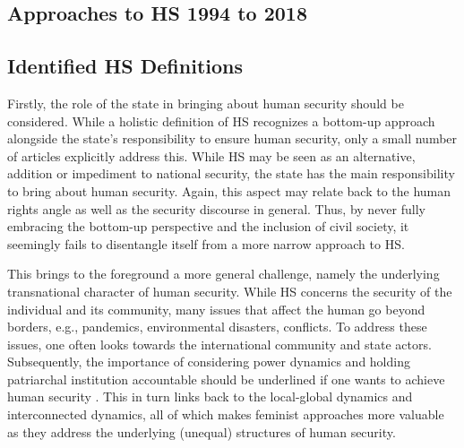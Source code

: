 \documentclass[10pt,a4paper]{article}
\begin{document}
\begin{multicols}{2}

\section{Approaches to HS 1994 to 2018}

\subsection{Identified HS Definitions}

\noindent {}

Firstly, the role of the state in bringing about human security should be considered. While a holistic definition of HS recognizes a bottom-up approach alongside the state's responsibility to ensure human security, only a small number of articles explicitly address this. While HS may be seen as an alternative, addition or impediment to national security, the state has the main responsibility to bring about human security. Again, this aspect may relate back to the human rights angle as well as the security discourse in general. Thus, by never fully embracing the bottom-up perspective and the inclusion of civil society, it seemingly fails to disentangle itself from a more narrow approach to HS. 

This brings to the foreground a more general challenge, namely the underlying transnational character of human security. While HS concerns the security of the individual and its community, many issues that affect the human go beyond borders, e.g., pandemics, environmental disasters, conflicts. To address these issues, one often looks towards the international community and state actors. Subsequently, the importance of considering power dynamics and holding patriarchal institution accountable should be underlined if one wants to achieve human security \citep{R11,R12}. This in turn links back to the local-global dynamics and interconnected dynamics, all of which makes feminist approaches more valuable as they address the underlying (unequal) structures of human security. 


\end{multicols}
\end{document}
